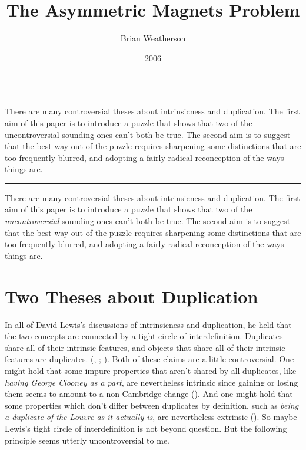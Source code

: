 \documentclass[
  10pt,
  letterpaper,
  DIV=11,
  numbers=noendperiod,
  twoside]{scrartcl}
\title{The Asymmetric Magnets Problem}
\author{Brian Weatherson}
\date{2006}
\renewenvironment{abstract}
 {\vspace{-1.25cm}
 \quotation\small\noindent\rule{\linewidth}{.5pt}\par\smallskip
 \noindent }
 {\par\noindent\rule{\linewidth}{.5pt}\endquotation}
\begin{document}
\maketitle
\begin{abstract}
There are many controversial theses about intrinsicness and duplication.
The first aim of this paper is to introduce a puzzle that shows that two
of the uncontroversial sounding ones can't both be true. The second aim
is to suggest that the best way out of the puzzle requires sharpening
some distinctions that are too frequently blurred, and adopting a fairly
radical reconception of the ways things are.
\end{abstract}

There are many controversial theses about intrinsicness and duplication.
The first aim of this paper is to introduce a puzzle that shows that two
of the \emph{uncontroversial} sounding ones can't both be true. The
second aim is to suggest that the best way out of the puzzle requires
sharpening some distinctions that are too frequently blurred, and
adopting a fairly radical reconception of the ways things are.

\section{Two Theses about
Duplication}\label{two-theses-about-duplication}

In all of David Lewis's discussions of intrinsicness and duplication, he
held that the two concepts are connected by a tight circle of
interdefinition. Duplicates share all of their intrinsic features, and
objects that share all of their intrinsic features are duplicates.
(,
;
). Both of these
claims are a little controversial. One might hold that some impure
properties that aren't shared by all duplicates, like \emph{having
George Clooney as a part}, are nevertheless intrinsic since gaining or
losing them seems to amount to a non-Cambridge change
(). And one might
hold that some properties which don't differ between duplicates by
definition, such as \emph{being a duplicate of the Louvre as it actually
is}, are nevertheless extrinsic (). So
maybe Lewis's tight circle of interdefinition is not beyond question.
But the following principle seems utterly uncontroversial to me.
\end{document}
